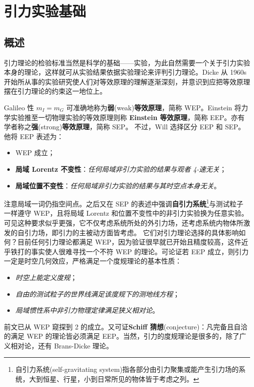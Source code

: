 \chapter{引力实验基础}\label{chpt:experiment}

\section{概述}\label{sec:eq-prin}

引力理论的检验标准当然是科学的基础——实验，为此自然需要一个关于引力实验本身的理论，这样就可从实验结果依据实验理论来评判引力理论。Dicke 从 1960s 开始所从事的实验研究使人们对等效原理的理解逐渐深刻，并意识到应把等效原理摆在引力理论的约束这一地位上。

Galileo 性 $m_I=m_G$ 可准确地称为\textbf{弱}(weak)\textbf{等效原理}，简称 WEP。Einstein 将力学实验推至一切物理实验的等效原理则称 \textbf{Einstein 等效原理}，简称 EEP。亦有学者称之\textbf{强}(strong)\textbf{等效原理}，简称 SEP。
不过，Will\cite{Will18} 选择区分 EEP 和 SEP。
他将 EEP 表述为：
\begin{itemize}
    \item WEP 成立；
    \item \textbf{局域 Lorentz 不变性}：\textit{任何局域非引力实验的结果与观者 4-速无关}；
    \item \textbf{局域位置不变性}：\textit{任何局域非引力实验的结果与其时空点本身无关}。
\end{itemize}
注意局域一词仍指空间点。之后又在 SEP 的表述中强调\textbf{自引力系统}\footnote{自引力系统(self-gravitating system)指各部分由引力聚集或能产生引力场的系统，大到恒星、行星，小到日常所见的物体皆于考虑之列。}与测试粒子一样遵守 WEP，且将局域 Lorentz 和位置不变性中的非引力实验换为任意实验。可见这种要求似乎更强，它不仅考虑系统所处的外引力场，还考虑系统内物体所激发的自引力场，即引力的主被动方面皆考虑。
它们对引力理论选择的具体影响如何？目前任何引力理论都满足 WEP，因为验证很早就已开始且精度较高，这件近乎铁打的事实使人很难寻找一个不符 WEP 的理论。可论证若 EEP 成立，则引力一定是时空几何效应，严格满足一个度规理论的基本性质：
\begin{itemize}
    \item \textit{时空上能定义度规}；
    \item \textit{自由的测试粒子的世界线满足该度规下的测地线方程}；
    \item \textit{局域惯性系中非引力物理定律满足狭义相对论}。
\end{itemize}
前文已从 WEP 窥探到 2 的成立。又可证\textbf{Schiff 猜想}(conjecture)：凡完备且自洽的满足 WEP 的理论皆必须满足 EEP。当然，引力的度规理论是很多的，除了广义相对论，还有 Brans-Dicke 理论。

